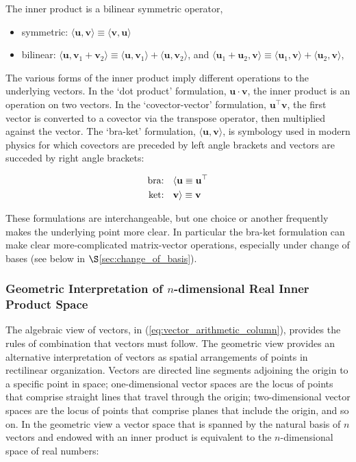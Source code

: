 \documentclass[12pt, twoside, draft]{article}
\begin{document}
The inner product is a bilinear symmetric operator, 
\begin{itemize}[noitemsep]
\item symmetric: $\langle \mathbf{u}, \mathbf{v} \rangle \equiv \langle \mathbf{v}, \mathbf{u} \rangle$
\item bilinear: $\langle \mathbf{u}, \mathbf{v}_1 + \mathbf{v}_2 \rangle \equiv \langle \mathbf{u}, \mathbf{v}_1 \rangle + \langle \mathbf{u}, \mathbf{v}_2 \rangle$, and $\langle \mathbf{u}_1 + \mathbf{u}_2, \mathbf{v} \rangle \equiv \langle \mathbf{u}_1, \mathbf{v} \rangle + \langle \mathbf{u}_2, \mathbf{v} \rangle$,
\end{itemize}

The various forms of the inner product imply different operations to the underlying vectors.  In the `dot product' formulation, $\mathbf{u} \cdot \mathbf{v}$, the inner product is an operation on two vectors.  In the `covector-vector' formulation, $\mathbf{u}^\top \mathbf{v}$, the first vector is converted to a covector via the transpose operator, then multiplied against the vector.  The `bra-ket' formulation, $\langle \mathbf{u}, \mathbf{v} \rangle$, is symbology used in modern physics for which covectors are preceded by left angle brackets and vectors are succeded by right angle brackets:

\begin{align}
\text{bra: \hspace{5pt}} & \langle \mathbf{u}  \equiv  \mathbf{u}^\top \\
\text{ket: \hspace{5pt}} & \mathbf{v} \rangle  \equiv  \mathbf{v} 
\end{align}

These formulations are interchangeable, but one choice or another frequently makes the underlying point more clear.  In particular the bra-ket formulation can make clear more-complicated matrix-vector operations, especially under change of bases (see below in $\S$\ref{sec:change_of_basis}).

\subsubsection{Geometric Interpretation of $n$-dimensional Real Inner Product Space}\label{sec:geometric-interpretation}
The algebraic view of vectors, in (\ref{eq:vector_arithmetic_column}), provides the rules of combination that vectors must follow.  The geometric view provides an alternative interpretation of vectors as spatial arrangements of points in rectilinear organization.  Vectors are directed line segments adjoining the origin to a specific point in space; one-dimensional vector spaces are the locus of points that comprise straight lines that travel through the origin; two-dimensional vector spaces are the locus of points that comprise planes that include the origin, and so on.  In the geometric view a vector space that is spanned by the natural basis of $n$ vectors and endowed with an inner product is equivalent to the $n$-dimensional space of real numbers:
\end{document}
